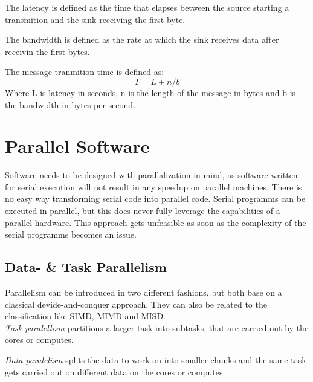 \documentclass{article}
\begin{document}
	The latency is defined as the time that elapses between the source starting a transmition
	and the sink receiving the first byte.
	
	The bandwidth is defined as the rate at which the sink receives data after receivin the first bytes.

	The message tranmition time is defined as:\\
		$$ T = L + n/b$$
	Where L is latency in seconds,
	n is the length of the message in bytes
	and b is the bandwidth in bytes per second.

\section{Parallel Software} %
\label{sec:parallel_software}
Software needs to be designed with parallalization in mind,
as software written for serial execution will not result in any speedup on parallel machines.
There is no easy way transforming serial code into parallel code.
Serial programms can be executed in parallel,
but this does never fully leverage the capabilities of a parallel hardware.
This approach gets unfeasible as soon as the complexity of the serial programms becomes an issue.

\subsection{Data- \& Task Parallelism} %
\label{sub:data_task_parallelism}
	Parallelism can be introduced in two different fashions,
	but both base on a classical devide-and-conquer approach.
	They can also be related to the classification like SIMD, MIMD and MISD.\\
	\textsl{Task paralellism} partitions a larger task into subtasks,
	that are carried out by the cores or computes.

	\textsl{Data paralelism} splits the data to work on into smaller chunks
	and the same task gets carried out on different data on the cores or computes.
\end{document}
